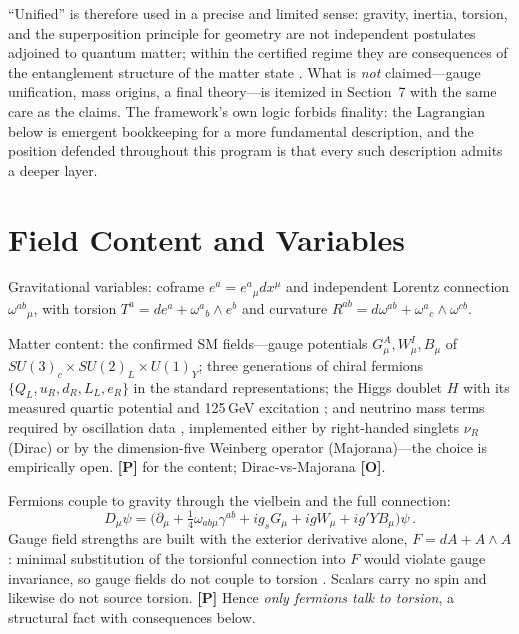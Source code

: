 \documentclass[11pt]{article}
\theoremstyle{definition}
\newcommand{\pP}{\textbf{[P]}}
\newcommand{\pO}{\textbf{[O]}}
\begin{document}
``Unified'' is therefore used in a precise and limited sense: gravity,
inertia, torsion, and the superposition principle for geometry are not
independent postulates adjoined to quantum matter; within the certified
regime they are consequences of the entanglement structure of the matter
state \cite{Jacobson1995,Faulkner2014,McGwier2026a}. What is \emph{not}
claimed---gauge unification, mass origins, a final theory---is itemized in
Section~7 with the same care as the claims. The framework's own logic
forbids finality: the Lagrangian below is emergent bookkeeping for a more
fundamental description, and the position defended throughout this program
is that every such description admits a deeper layer.

\section{Field Content and Variables}

Gravitational variables: coframe $e^a=e^a{}_\mu dx^\mu$ and independent
Lorentz connection $\omega^{ab}{}_\mu$, with torsion
$T^a=de^a+\omega^a{}_b\wedge e^b$ and curvature
$R^{ab}=d\omega^{ab}+\omega^a{}_c\wedge\omega^{cb}$.

Matter content: the confirmed SM fields---gauge potentials
$G^A_\mu, W^I_\mu, B_\mu$ of $SU(3)_c\times SU(2)_L\times U(1)_Y$; three
generations of chiral fermions $\{Q_L,u_R,d_R,L_L,e_R\}$ in the standard
representations; the Higgs doublet $H$ with its measured quartic potential
and 125\,GeV excitation \cite{ATLAS2012,CMS2012}; and neutrino mass terms
required by oscillation data \cite{SuperK1998}, implemented either by
right-handed singlets $\nu_R$ (Dirac) or by the dimension-five Weinberg
operator (Majorana)---the choice is empirically open. \pP{} for the
content; Dirac-vs-Majorana \pO{}.

Fermions couple to gravity through the vielbein and the full connection:
\begin{equation}
D_\mu\psi=\Big(\partial_\mu+\tfrac{1}{4}\omega_{ab\mu}\gamma^{ab}
+ig_s G_\mu+ig W_\mu+ig' Y B_\mu\Big)\psi\,.
\end{equation}
Gauge field strengths are built with the exterior derivative alone,
$F=dA+A\wedge A$: minimal substitution of the torsionful connection into
$F$ would violate gauge invariance, so gauge fields do not couple to
torsion \cite{HehlRMP1976,Shapiro2002}. Scalars carry no spin and likewise
do not source torsion. \pP{} Hence \emph{only fermions talk to torsion}, a
structural fact with consequences below.
\end{document}
